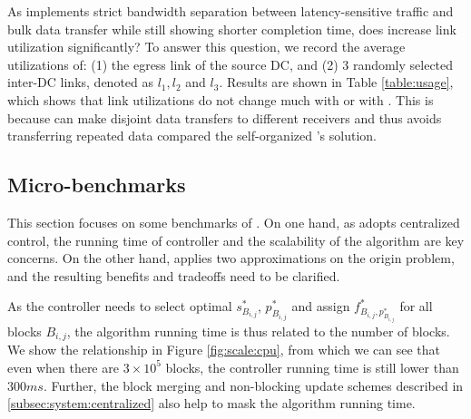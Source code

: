 As \name implements strict bandwidth separation between latency-sensitive traffic and bulk data transfer while still showing shorter completion time, does \name increase link utilization significantly? To answer this question, we record the average utilizations of: (1) the egress link of the source DC, and (2) 3 randomly selected inter-DC links, denoted as $l_1,l_2$ and $l_3$. Results are shown in Table \ref{table:usage}, which shows that link utilizations do not change much with \name or with \company. This is because \name can make disjoint data transfers to different receivers and thus avoids transferring repeated data compared the self-organized \company's solution.


\subsection{Micro-benchmarks}
\label{subsec:evaluation:benchmarks}

This section focuses on some benchmarks of \name. On one hand, as \name adopts centralized control, the running time of controller and the scalability of the algorithm are key concerns. On the other hand, \name applies two approximations on the origin problem, and the resulting benefits and tradeoffs need to be clarified.


 As the controller needs to select optimal $s_{B_{i,j}}^*$, $p_{B_{i,j}}^*$ and assign $f^*_{B_{i,j},p_{B_{i,j}}^*}$ for all blocks $B_{i,j}$, the algorithm running time is thus related to the number of blocks. We show the relationship in Figure \ref{fig:scale:cpu}, from which we can see that even when there are $3\times 10^5$ blocks, the controller running time is still lower than $300ms$. Further, the block merging and non-blocking update schemes described in \Section\ref{subsec:system:centralized} also help to mask the algorithm running time.

